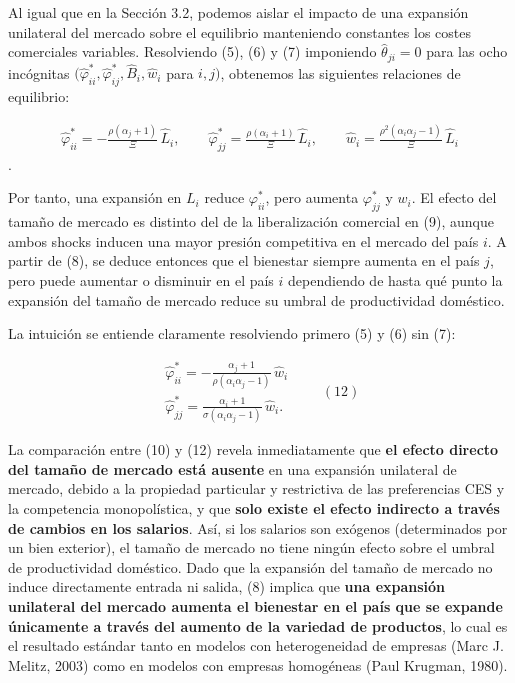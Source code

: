 \documentclass[10pt,a4paper]{article}
\begin{document}
Al igual que en la Sección 3.2, podemos aislar el impacto de una expansión unilateral del mercado sobre el equilibrio manteniendo constantes los costes comerciales variables. Resolviendo (5), (6) y (7) imponiendo $\hat{\theta}_{ji} = 0$ para las ocho incógnitas $(\hat{\varphi}_{ii}^*, \hat{\varphi}_{ij}^*, \hat{B}_i, \hat{w}_i$ para $i,j)$, obtenemos las siguientes relaciones de equilibrio:

$$\begin{aligned}
    \hat{\varphi}_{ii}^* =-\frac{\rho(\alpha_j+1)}{\Xi}\,\hat{L}_i,\qquad\hat{\varphi}_{jj}^* =\frac{\rho(\alpha_i+1)}{\Xi}\,\hat{L}_i,\qquad\hat{w}_i =\frac{\rho^2(\alpha_i\alpha_j-1)}{\Xi}\,\hat{L}_i
\end{aligned}$$.

Por tanto, una expansión en $L_i$ reduce $\varphi_{ii}^*$, pero aumenta $\varphi_{jj}^*$ y $w_i$. El efecto del tamaño de mercado es distinto del de la liberalización comercial en (9), aunque ambos shocks inducen una mayor presión competitiva en el mercado del país $i$. A partir de (8), se deduce entonces que el bienestar siempre aumenta en el país $j$, pero puede aumentar o disminuir en el país $i$ dependiendo de hasta qué punto la expansión del tamaño de mercado reduce su umbral de productividad doméstico.

La intuición se entiende claramente resolviendo primero (5) y (6) sin (7):

$$\begin{aligned}
    \hat{\varphi}_{ii}^* =-\frac{\alpha_j + 1}{\rho(\alpha_i\alpha_j - 1)}\,\hat{w}_i\\[2em]
    \hat{\varphi}_{jj}^* =\frac{\alpha_i + 1}{\sigma(\alpha_i\alpha_j - 1)}\,\hat{w}_i.
\end{aligned}\qquad (12)$$

La comparación entre (10) y (12) revela inmediatamente que \textbf{el efecto directo del tamaño de mercado está ausente} en una expansión unilateral de mercado, debido a la propiedad particular y restrictiva de las preferencias CES y la competencia monopolística, y que \textbf{solo existe el efecto indirecto a través de cambios en los salarios}. Así, si los salarios son exógenos (determinados por un bien exterior), el tamaño de mercado no tiene ningún efecto sobre el umbral de productividad doméstico. Dado que la expansión del tamaño de mercado no induce directamente entrada ni salida, (8) implica que \textbf{una expansión unilateral del mercado aumenta el bienestar en el país que se expande únicamente a través del aumento de la variedad de productos}, lo cual es el resultado estándar tanto en modelos con heterogeneidad de empresas (Marc J. Melitz, 2003) como en modelos con empresas homogéneas (Paul Krugman, 1980).
\end{document}
